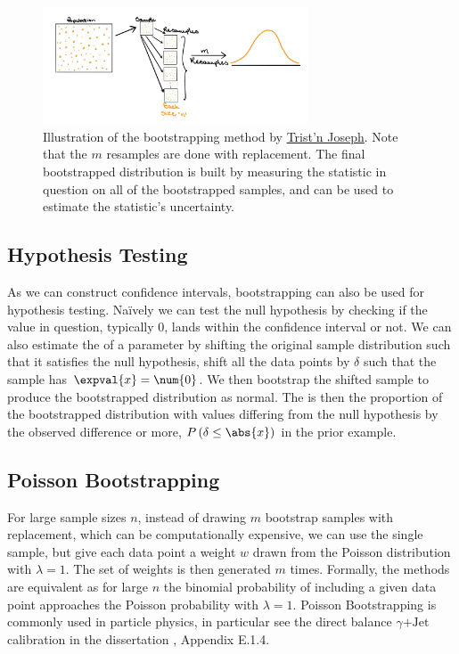 \begin{figure}
\centering
\includegraphics[width=0.7\textwidth]{figures/stats/bootstrapping.jpeg}
\caption{
Illustration of the bootstrapping method
by \href{https://towardsdatascience.com/bootstrapping-statistics-what-it-is-and-why-its-used-e2fa29577307}{Trist'n Joseph}.
Note that the $m$ resamples are done with replacement.
The final bootstrapped distribution is built by measuring the statistic in question on all of the bootstrapped samples,
and can be used to estimate the statistic's uncertainty.
}
\label{fig:bootstrapping}
\end{figure}

\subsection{Hypothesis Testing}
\label{stats:bootstrapping:hypo}

As we can construct confidence intervals, bootstrapping can also be used for hypothesis testing.
N{a\"i}vely we can test the null hypothesis by checking if the value in question,
typically \num{0}, lands within the confidence interval or not.
We can also estimate the \pvalue of a parameter by shifting the original sample distribution such that
it satisfies the null hypothesis, \eg shift all the data points by $\delta$ such that the sample has $\expval{x} = \num{0}$.
We then bootstrap the shifted sample to produce the bootstrapped distribution as normal.
The \pvalue is then the proportion of the bootstrapped distribution
with values differing from the null hypothesis by the observed difference or more,
\eg $P\left(\delta \leq \abs{x}\right)$ in the prior example.

\subsection{Poisson Bootstrapping}
\label{stats:bootstrapping:poisson}

For large sample sizes $n$, instead of drawing $m$ bootstrap samples with replacement,
which can be computationally expensive,
we can use the single sample,
but give each data point a weight $w$ drawn
from the Poisson distribution with $\lambda = 1$.
The set of weights is then generated $m$ times.
Formally, the methods are equivalent as for large $n$
the binomial probability of including a given data point approaches the Poisson probability with $\lambda = 1$.
Poisson Bootstrapping is commonly used in particle physics,
in particular see the direct balance $\gamma\text{+Jet}$ calibration
in the dissertation \cite{mepland_dissertation}, Appendix E.1.4.

